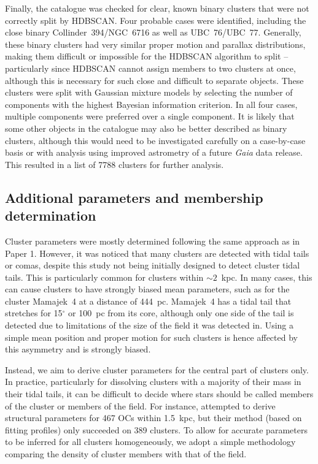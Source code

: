 Finally, the catalogue was checked for clear, known binary clusters that were not correctly split by HDBSCAN. Four probable cases were identified, including the close binary Collinder~394/NGC~6716 as well as UBC~76/UBC~77. Generally, these binary clusters had very similar proper motion and parallax distributions, making them difficult or impossible for the HDBSCAN algorithm to split -- particularly since HDBSCAN cannot assign members to two clusters at once, although this is necessary for such close and difficult to separate objects. These clusters were split with Gaussian mixture models by selecting the number of components with the highest Bayesian information criterion. In all four cases, multiple components were preferred over a single component. It is likely that some other objects in the catalogue may also be better described as binary clusters, although this would need to be investigated carefully on a case-by-case basis \citep[see e.g.][]{kovaleva_collinder_2020, anders_ngc_2022-1} or with analysis using improved astrometry of a future \emph{Gaia} data release. This resulted in a list of 7788 clusters for further analysis.




\subsection{Additional parameters and membership determination}\label{c3:sec:clustering:parameters}

Cluster parameters were mostly determined following the same approach as in Paper 1. However, it was noticed that many clusters are detected with tidal tails or comas, despite this study not being initially designed to detect cluster tidal tails. This is particularly common for clusters within $\sim2$~kpc. In many cases, this can cause clusters to have strongly biased mean parameters, such as for the cluster Mamajek~4 at a distance of 444~pc. Mamajek~4 has a tidal tail that stretches for 15$^\circ$ or 100~pc from its core, although only one side of the tail is detected due to limitations of the size of the field it was detected in. Using a simple mean position and proper motion for such clusters is hence affected by this asymmetry and is strongly biased. 

Instead, we aim to derive cluster parameters for the central part of clusters only. In practice, particularly for dissolving clusters with a majority of their mass in their tidal tails, it can be difficult to decide where stars should be called members of the cluster or members of the field. For instance, \cite{tarricq_structural_2022} attempted to derive structural parameters for 467 OCs within 1.5~kpc, but their method (based on fitting \cite{king_structure_1962} profiles) only succeeded on 389 clusters. To allow for accurate parameters to be inferred for all clusters homogeneously, we adopt a simple methodology comparing the density of cluster members with that of the field.

